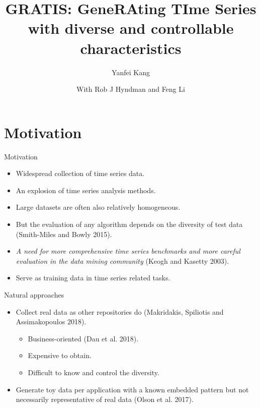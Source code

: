 \documentclass[12pt,ignorenonframetext,compress]{beamer}
\institute{At the 39th ISF}
\title{GRATIS: GeneRAting TIme Series with diverse and controllable characteristics}
\author{Yanfei Kang}
\date{With Rob J Hyndman and Feng Li}
\providecommand{\tightlist}{%
  \setlength{\itemsep}{0pt}\setlength{\parskip}{0pt}}
\begin{document}
\frame{\titlepage}

\hypertarget{motivation}{%
\section{Motivation}\label{motivation}}

\begin{frame}{Motivation}
\protect\hypertarget{motivation-1}{}

\begin{itemize}
\tightlist
\item 
  Widespread collection of time series data.
\item
  An explosion of time series analysis methods.
\item
  Large datasets are often also relatively homogeneous.
\item 
  But the evaluation of any algorithm depends on the diversity of test data (Smith-Miles and Bowly 2015).
\item
  \textit{A need for more comprehensive time series benchmarks and more careful evaluation in the data mining community} (Keogh and Kasetty 2003).
\item Serve as training data in time series related tasks.

\end{itemize}

\end{frame}



\begin{frame}{Natural approaches}
\begin{itemize}
\item 
Collect real data as other repositories do (Makridakis, Spiliotis and Assimakopoulos 2018).
\begin{itemize}
\item
Business-oriented  (Dau et al. 2018).
\item
Expensive to obtain.
\item 
Difficult to know and control the diversity.
\end{itemize}
\item
Generate toy data per application with a known embedded pattern but not necessarily representative of real data (Olson et al. 2017).
\end{itemize}
\end{frame}
\end{document}
